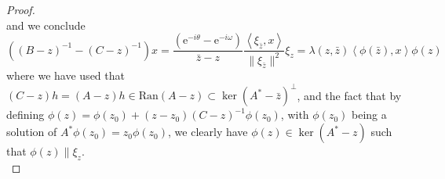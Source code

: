 \documentclass[a4paper,11pt]{article}
\newcommand{\euler}[1]{\text{e}^{#1}}
\newcommand{\Ran}[1]{\text{Ran}\left(#1\right)}
\renewcommand{\braket}[1]{\left\langle#1\right\rangle}
\numberwithin{equation}{section}
\begin{document}
\begin{proof}
\begin{equation}
	\end{equation}
	and we conclude \begin{equation}
		\left((B-z)^{-1}-(C-z)^{-1}\right)x=\frac{(\euler{-i\theta}-\euler{-i\omega})}{\bar{z}-z}\frac{\braket{\xi_{\bar{z}},x}}{\|\xi_{\bar{z}}\|^2}\xi_{z}=\lambda(z,\bar{z})\braket{\phi(\bar{z}),x}\phi(z)
	\end{equation}
	where we have used that $ (C-z)h=(A-z)h\in\Ran{A-z}\subset\ker(A^*-\bar{z})^\perp $, and the fact that by defining $\phi(z)=\phi(z_0)+(z-z_0)(C-z)^{-1}\phi(z_0) $, with $ \phi(z_0) $ being a solution of $ A^*\phi(z_0)=z_0\phi(z_0) $, we clearly have $ \phi(z)\in\ker(A^*-z) $ such that $ \phi(z)\parallel\xi_z $.\\

\end{proof}
\end{document}
